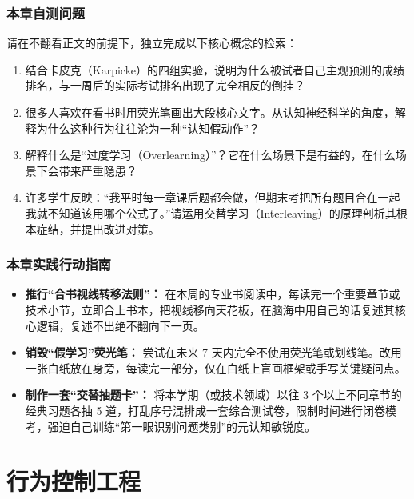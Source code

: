\documentclass[12pt,a4paper,openany]{ctexbook}
\begin{document}
\section*{本章自测问题}
请在不翻看正文的前提下，独立完成以下核心概念的检索：
\begin{enumerate}
    \item 结合卡皮克（Karpicke）的四组实验，说明为什么被试者自己主观预测的成绩排名，与一周后的实际考试排名出现了完全相反的倒挂？
    \item 很多人喜欢在看书时用荧光笔画出大段核心文字。从认知神经科学的角度，解释为什么这种行为往往沦为一种“认知假动作”？
    \item 解释什么是“过度学习（Overlearning）”？它在什么场景下是有益的，在什么场景下会带来严重隐患？
    \item 许多学生反映：“我平时每一章课后题都会做，但期末考把所有题目合在一起我就不知道该用哪个公式了。”请运用交替学习（Interleaving）的原理剖析其根本症结，并提出改进对策。
\end{enumerate}

\section*{本章实践行动指南}
\begin{practicebox}[本周去伪存真刻意练习清单]
\begin{itemize}
    \item[$\square$] \textbf{推行“合书视线转移法则”：} 在本周的专业书阅读中，每读完一个重要章节或技术小节，立即合上书本，把视线移向天花板，在脑海中用自己的话复述其核心逻辑，复述不出绝不翻向下一页。
    \item[$\square$] \textbf{销毁“假学习”荧光笔：} 尝试在未来 7 天内完全不使用荧光笔或划线笔。改用一张白纸放在身旁，每读完一部分，仅在白纸上盲画框架或手写关键疑问点。
    \item[$\square$] \textbf{制作一套“交替抽题卡”：} 将本学期（或技术领域）以往 3 个以上不同章节的经典习题各抽 5 道，打乱序号混排成一套综合测试卷，限制时间进行闭卷模考，强迫自己训练“第一眼识别问题类别”的元认知敏锐度。
\end{itemize}
\end{practicebox}

\part{行为控制工程}
\end{document}
